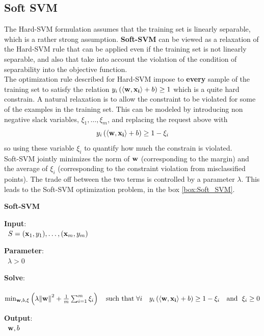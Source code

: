 \documentclass[12pt]{report}
\theoremstyle{plain}
\newcommand\sprod[2]{\langle \vb{#1},\vb{#2}\rangle}
\begin{document}
\begin{flushleft}
\section{Soft SVM}
The Hard-SVM formulation assumes that the training set is linearly separable, which is a rather strong assumption. \textbf{Soft-SVM} can be viewed as a relaxation of the Hard-SVM rule that can be applied even if the training set is not linearly separable, and also that take into account the violation of the condition of separability into the objective function.\\
The optimization rule described for Hard-SVM impose to \textbf{every} sample of the training set to satisfy the relation $y_i\left(\sprod{w}{x_i}+b\right)\geq 1$ which is a quite hard constrain. A natural relaxation is to allow the constraint to be violated for some of the examples in the training set. This can be modeled by introducing non negative slack variables, $\xi_1,\dots,\xi_m$, and replacing the request above with 
\begin{equation}
y_i\left(\sprod{w}{x_i}+b\right)\geq 1-\xi_i
\label{eq:Soft_SVM}
\end{equation}
so using these variable $\xi_i$ to quantify how much the constrain is violated.\\
Soft-SVM jointly minimizes the norm of $\vb{w}$ (corresponding to the margin) and the average of $\xi_i$ (corresponding to the constraint violation from misclassified points). The trade off between the two terms is controlled by a parameter $\lambda$. This leads to the Soft-SVM optimization problem, in the box \ref{box:Soft_SVM}.\\
\begin{tcolorbox}
	\begin{center}
		\textbf{Soft-SVM}
	\end{center}
	\textbf{Input}:\\
	\-\ \qquad $S=(\vb{x}_1,y_1),\dots,(\vb{x}_m,y_m)$
	
	\textbf{Parameter}:\\
	\-\ \qquad $\lambda>0$
	
	\textbf{Solve}:\\
	\-\ \qquad $\min_{\vb{w},b,\xi}\left(\lambda\norm{\vb{w}}^2+\frac{1}{m}\sum_{i=1}^m\xi_i\right) \quad\text{such that}\;\forall i \quad y_i\left(\sprod{w}{x_i}+b\right)\geq 1-\xi_i\quad \text{and }\;\xi_i\geq 0$
	
	\textbf{Output}:\\
	\-\ \qquad $\vb{w},b$
	

\end{tcolorbox}
\end{flushleft}
\end{document}
